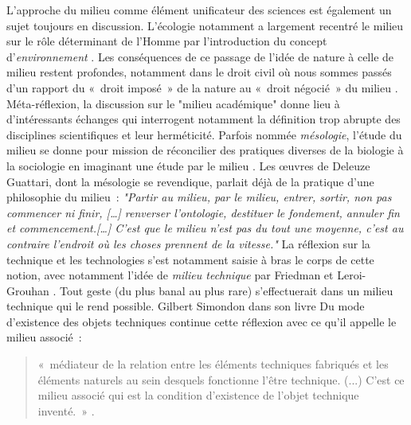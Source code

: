 L’approche du milieu comme élément unificateur des sciences est également un sujet toujours en discussion. L’écologie notamment a largement recentré le milieu sur le rôle déterminant de l’Homme par l’introduction du concept d’\textit{environnement} \citep{Gandolfo2008}. Les conséquences de ce passage de l’idée de nature à celle de milieu restent profondes, notamment dans le droit civil où nous sommes passés d’un rapport du « droit imposé » de la nature au « droit négocié » du milieu \citep{Papaux2008}. Méta-réflexion, la discussion sur le "milieu académique" donne lieu à d’intéressants échanges \citep{Stengers2009} qui interrogent notamment la définition trop abrupte des disciplines scientifiques et leur herméticité. Parfois nommée \textit{mésologie}, l’étude du milieu se donne pour mission de réconcilier des pratiques diverses de la biologie à la sociologie en imaginant une étude par le milieu \citep{Stengers2003}. Les œuvres de Deleuze  Guattari, dont la mésologie se revendique, parlait déjà de la pratique d’une philosophie du milieu : \textit{"Partir au milieu, par le milieu, entrer, sortir, non pas commencer ni ﬁnir, […] renverser l'ontologie, destituer le fondement, annuler ﬁn et commencement.[…] C'est que le milieu n'est pas du tout une moyenne, c'est au contraire l'endroit où les choses prennent de la vitesse."} \citep{Deleuze1972} 
La réflexion sur la technique et les technologies s’est notamment saisie à bras le corps de cette notion, avec notamment l’idée de \textit{milieu technique} par Friedman et Leroi-Grouhan \citep{Stiegler1998}. Tout geste (du plus banal au plus rare) s’effectuerait dans un milieu technique qui le rend possible. Gilbert Simondon dans son livre Du mode d’existence des objets techniques continue cette réflexion avec ce qu’il appelle le milieu associé : 
\begin{quote}
« médiateur de la relation entre les éléments techniques fabriqués et les éléments 	naturels au sein desquels fonctionne l’être technique. (...) C’est ce milieu associé 	qui est la condition d’existence de l’objet technique inventé. » \citep{Simondon1989}. 
\end{quote}

